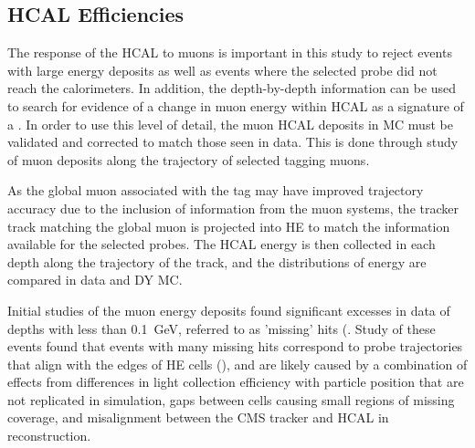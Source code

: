 \subsection{HCAL Efficiencies}
\label{sec:HCALeff}
The response of the HCAL to muons is important in this study to reject events with large energy deposits as well as events where the selected probe did not reach the calorimeters.
In addition, the depth-by-depth information can be used to search for evidence of a change in muon energy within HCAL as a signature of a \dbrem.
In order to use this level of detail, the muon HCAL deposits in MC must be validated and corrected to match those seen in data.
This is done through study of muon deposits along the trajectory of selected tagging muons.

As the global muon associated with the tag may have improved trajectory accuracy due to the inclusion of information from the muon systems, the tracker track matching the global muon is projected into HE to match the information available for the selected probes.
The HCAL energy is then collected in each depth along the trajectory of the track, and the distributions of energy are compared in data and DY MC. 

Initial studies of the muon energy deposits found significant excesses in data of depths with less than \SI{0.1}{\giga\eV}, referred to as 'missing' hits (. 
Study of these events found that events with many missing hits correspond to probe trajectories that align with the edges of HE cells (), and are likely caused by a combination of effects from differences in light collection efficiency with particle position that are not replicated in simulation, gaps between cells causing small regions of missing coverage, and misalignment between the CMS tracker and HCAL in reconstruction.


